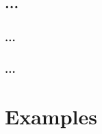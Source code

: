 \documentclass[10pt,a4paper]{simson}
\begin{document}
\section{...}

\subsection{...}


\subsection{...}


\chapter{Examples}

\newpage



\end{document}
